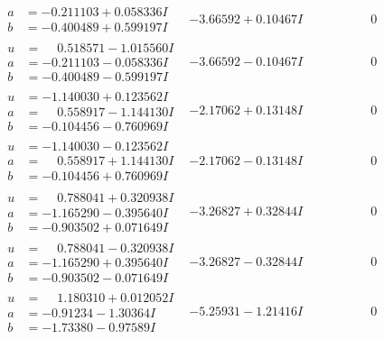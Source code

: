 \documentclass[1p]{elsarticle_modified}
\theoremstyle{definition}
\begin{document}
$$\begin{array}{c|c|c}
\begin{aligned}
a &= -0.211103 + 0.058336 I \\
b &= -0.400489 + 0.599197 I\end{aligned}
 & -3.66592 + 0.10467 I & \phantom{-0.000000 } 0 \\ \hline\begin{aligned}
u &= \phantom{-}0.518571 - 1.015560 I \\
a &= -0.211103 - 0.058336 I \\
b &= -0.400489 - 0.599197 I\end{aligned}
 & -3.66592 - 0.10467 I & \phantom{-0.000000 } 0 \\ \hline\begin{aligned}
u &= -1.140030 + 0.123562 I \\
a &= \phantom{-}0.558917 - 1.144130 I \\
b &= -0.104456 - 0.760969 I\end{aligned}
 & -2.17062 + 0.13148 I & \phantom{-0.000000 } 0 \\ \hline\begin{aligned}
u &= -1.140030 - 0.123562 I \\
a &= \phantom{-}0.558917 + 1.144130 I \\
b &= -0.104456 + 0.760969 I\end{aligned}
 & -2.17062 - 0.13148 I & \phantom{-0.000000 } 0 \\ \hline\begin{aligned}
u &= \phantom{-}0.788041 + 0.320938 I \\
a &= -1.165290 - 0.395640 I \\
b &= -0.903502 + 0.071649 I\end{aligned}
 & -3.26827 + 0.32844 I & \phantom{-0.000000 } 0 \\ \hline\begin{aligned}
u &= \phantom{-}0.788041 - 0.320938 I \\
a &= -1.165290 + 0.395640 I \\
b &= -0.903502 - 0.071649 I\end{aligned}
 & -3.26827 - 0.32844 I & \phantom{-0.000000 } 0 \\ \hline\begin{aligned}
u &= \phantom{-}1.180310 + 0.012052 I \\
a &= -0.91234 - 1.30364 I \\
b &= -1.73380 - 0.97589 I\end{aligned}
 & -5.25931 - 1.21416 I & \phantom{-0.000000 } 0 \\ \hline\begin{aligned}

\end{aligned}
\end{array}$$
\end{document}
